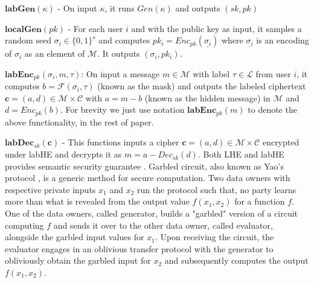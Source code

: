 \squishlist
 \item $\textbf{labGen}(\kappa)$ - On input $\kappa$, it runs $Gen(\kappa)$ and outputs $(sk,pk)$
\item $\textbf{localGen}(pk)$ -  For each user $i$ and with the public key as input, it samples a random seed $\sigma_i \in \{0,1\}^s$ and computes $pk_i = Enc_{pk}(\underline{\sigma_i})$ where $\underline{\sigma_i}$ is an  encoding of $\sigma_i$ as an  element of $\mathcal{M}$. It outputs $(\sigma_i,pk_i)$.
\item $\textbf{labEnc}_{pk}(\sigma_i, m , \tau)$: On input a message $m \in \mathcal{M} $ with label $\tau \in \mathcal{L}$  from user $i$, it computes $b=\mathcal{F}(\sigma_i, \tau)$ (known as the mask) and outputs the labeled ciphertext $\mathbf{c}=(a,d) \in \mathcal{M} \times \mathcal{C}$ with $ a= m- b$  (known as the hidden message) in $\mathcal{M}$ and $d=Enc_{pk}(b)$. For brevity we just use notation $\textbf{labEnc}_{pk}(m)$ to denote the above functionality, in the rest of paper. 
\item $\textbf{labDec}_{sk}(\mathbf{c})$ - This functions inputs a cipher $\mathbf{c}=(a,d) \in \mathcal{M} \times \mathcal{C}$ encrypted under  \textsf{labHE} and decrypts it as $m=a-Dec_{sk}(d)$.\squishend
Both \textsf{LHE} and \textsf{labHE} provides semantic security guarantee \cite{Katz}.
Garbled circuit, also known as Yao's protocol \cite{Yao,Yao2},  is a generic method for secure computation. Two data owners with respective private inputs $x_1$ and $x_2$ run the protocol such that, no party learns more  
than what is revealed from the output value $f(x_1,x_2)$ for a function $f$.  One of the data owners, called
generator, builds a "garbled" version of a circuit computing $f$ and sends it over to the other data owner, called evaluator, alongside the garbled input values for $x_1$.  Upon receiving the circuit, the evaluator 
engages in an oblivious transfer protocol with the generator to obliviously obtain the garbled input for $x_2$ and subsequently computes the  output $f(x_1, x_2)$.

